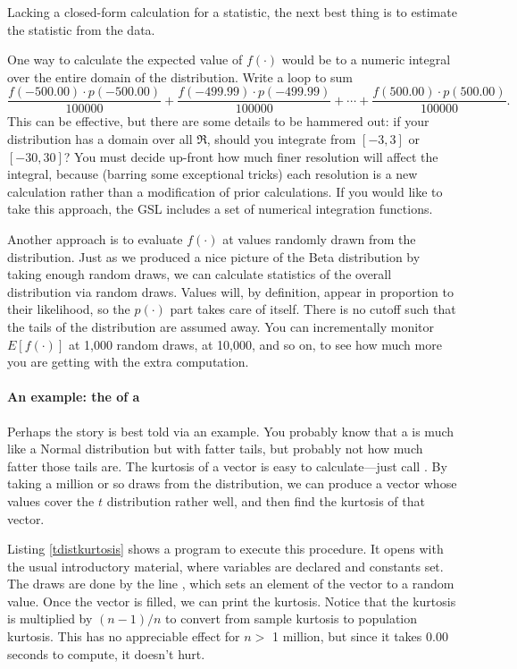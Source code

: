 Lacking a closed-form calculation for a statistic, the next best thing
is to estimate the statistic from the data. 

One way to calculate the expected value of $f(\cdot)$ would be to a numeric
integral over the entire domain of the distribution. Write a loop to
sum $$\frac{f(-500.00)\cdot p(-500.00)}{100000} + \frac{f(-499.99)\cdot
p(-499.99)}{100000} + \cdots + \frac{f(500.00)\cdot p(500.00)}{100000}.$$ This can be effective, but there are
some details to be hammered out: if your distribution has a domain over all
$\Re$, should you integrate from $[-3,3]$
or $[-30,30]$? You must decide up-front how much finer resolution will
affect the integral, because (barring some exceptional tricks) each
resolution is a new calculation rather than a modification of prior 
calculations. If you would like to take this approach, the GSL includes
a set of numerical integration functions.

Another approach is to evaluate $f(\cdot)$ at values randomly drawn
from the distribution.  Just as we produced a nice picture of the
Beta distribution by taking enough random draws, we can calculate
statistics of the overall distribution via random draws.  Values will,
by definition, appear in proportion to their likelihood, so the $p(\cdot)$
part takes care of itself. There is no cutoff such that the tails of the
distribution are assumed away. You can incrementally monitor
$E[f(\cdot)]$ at 1,000 random draws, at 10,000, and so on, to see how
much more you are getting with the extra computation.


\paragraph{An example: the  of a }\label{tkurt} 
Perhaps the
story is best told via an example.  You probably
know that a  is much like a Normal distribution but
with fatter tails, but probably not how much fatter those tails are.
The kurtosis of a vector is easy to calculate---just call
. By taking a million or so draws from the
distribution, we can produce a vector whose values cover the $t$
distribution rather well, and then find the kurtosis of that vector.

Listing \ref{tdistkurtosis} shows a program to execute this procedure. 
It opens with the usual introductory material, where variables are
declared and constants set. The draws are done by the line
, which sets an
element of the vector  to a random value. Once the vector is
filled, we can print the kurtosis. Notice that the kurtosis is
multiplied by $(n-1)/n$ to convert from sample kurtosis to population 
kurtosis. This has no appreciable effect for $n >$ 1 million, but since it takes
0.00 seconds to compute, it doesn't hurt.

